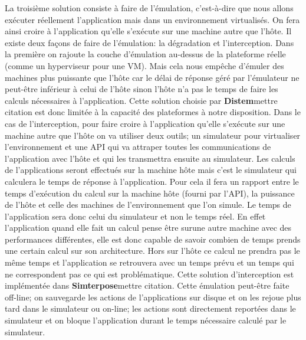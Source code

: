 La troisième solution consiste à faire de l'émulation, c'est-à-dire que nous allons exécuter réellement l'application mais dans un environnement virtualisés. On fera ainsi croire à l'application qu'elle s'exécute sur une machine autre que l'hôte. Il existe deux façons de faire de l'émulation: la dégradation et l'interception. Dans la première on rajoute la couche d'émulation au-dessus de la plateforme réelle (comme un hyperviseur pour une VM). Mais cela nous empêche d'émuler des machines plus puissante que l'hôte car le délai de réponse géré par l'émulateur ne peut-être inférieur à celui de l'hôte sinon l'hôte n'a pas le temps de faire les calculs nécessaires à l'application. Cette solution choisie par \textbf{Distem}{\color{red}mettre citation} est donc limitée à la capacité des plateformes à notre disposition. Dans le cas de l'interception, pour faire croire à l'application qu'elle s'exécute sur une machine autre que l'hôte on va utiliser deux outils; un simulateur pour virtualiser l'environnement et une {\color{red}API} qui va attraper toutes les communications de l'application avec l'hôte et qui les transmettra ensuite au simulateur. Les calculs de l'applications seront effectués sur la machine hôte mais c'est le simulateur qui calculera le temps de réponse à l'application. Pour cela il fera un rapport entre le temps d'exécution du calcul sur la machine hôte (fourni par l'API), la puissance de l'hôte et celle des machines de l'environnement que l'on simule. Le temps de l'application sera donc celui du simulateur et non le temps réel. En effet l'application quand elle fait un calcul pense être surune autre machine avec des performances différentes, elle est donc capable de savoir combien de temps prends une certain calcul sur son architecture. Hors sur l'hôte ce calcul ne prendra pas le même temps et l'application se retrouvera avec un temps prévu et un temps qui ne correspondent pas ce qui est problématique. Cette solution d'interception est implémentée dans \textbf{Simterpose}{\color{red}mettre citation}. Cette émulation peut-être faite off-line; on sauvegarde les actions de l'applications sur disque et on les rejoue plus tard dans le simulateur ou on-line; les actions sont directement reportées dans le simulateur et on bloque l'application durant le temps nécessaire calculé par le simulateur.

